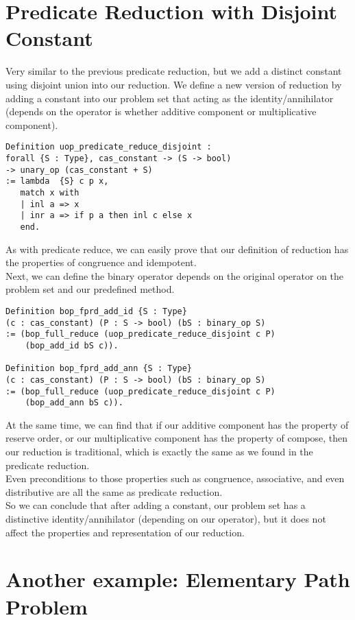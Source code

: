 \documentclass[a4paper,12pt,twoside,openright]{report}
\begin{document}
\section{Predicate Reduction with Disjoint Constant}
Very similar to the previous predicate reduction, but we add a distinct constant using disjoint union into our reduction. We define a new version of reduction by adding a constant into our problem set that acting as the identity/annihilator (depends on the operator is whether additive component or multiplicative component).
\begin{lstlisting}
Definition uop_predicate_reduce_disjoint : 
forall {S : Type}, cas_constant -> (S -> bool) 
-> unary_op (cas_constant + S)
:= lambda  {S} c p x,
   match x with     
   | inl a => x
   | inr a => if p a then inl c else x
   end.
\end{lstlisting}
As with predicate reduce, we can easily prove that our definition of reduction has the properties of congruence and idempotent.\\
Next, we can define the binary operator depends on the original operator on the problem set and our predefined method.
\begin{lstlisting}
Definition bop_fprd_add_id {S : Type} 
(c : cas_constant) (P : S -> bool) (bS : binary_op S) 
:= (bop_full_reduce (uop_predicate_reduce_disjoint c P) 
	(bop_add_id bS c)).

Definition bop_fprd_add_ann {S : Type} 
(c : cas_constant) (P : S -> bool) (bS : binary_op S) 
:= (bop_full_reduce (uop_predicate_reduce_disjoint c P) 
	(bop_add_ann bS c)).
\end{lstlisting}
At the same time, we can find that if our additive component has the property of reserve order, or our multiplicative component has the property of compose, then our reduction is traditional, which is exactly the same as we found in the predicate reduction.\\
Even preconditions to those properties such as congruence, associative, and even distributive are all the same as predicate reduction.\\
So we can conclude that after adding a constant, our problem set has a distinctive identity/annihilator (depending on our operator), but it does not affect the properties and representation of our reduction.


\section{Another example: Elementary Path Problem}
\end{document}
